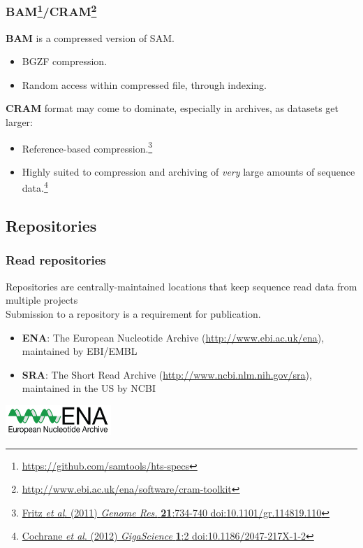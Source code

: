 \begin{frame}[fragile]
  \frametitle{BAM\footnote{\tiny{\href{http://samtools.github.io/hts-specs/SAMv1.pdf}{https://github.com/samtools/hts-specs}}}/CRAM\footnote{\tiny{\href{http://www.ebi.ac.uk/ena/software/cram-toolkit}{http://www.ebi.ac.uk/ena/software/cram-toolkit}}}}
  \textbf{BAM} is a compressed version of SAM.\\
  \begin{itemize}
    \item BGZF compression.
    \item Random access within compressed file, through indexing.
  \end{itemize}
  \textbf{CRAM} format may come to dominate, especially in archives, as datasets get larger:
  \begin{itemize}
    \item Reference-based compression.\footnote{\tiny{\href{http://dx.doi.org/10.1101/gr.114819.110}{Fritz \textit{et al}. (2011) \textit{Genome Res.} \textbf{21}:734-740 doi:10.1101/gr.114819.110}}}
    \item Highly suited to compression and archiving of \textit{very} large amounts of sequence data.\footnote{\tiny{\href{http://dx.doi.org/10.1186/2047-217X-1-2}{Cochrane \textit{et al}. (2012) \textit{GigaScience} \textbf{1}:2 doi:10.1186/2047-217X-1-2}}}
  \end{itemize}  
\end{frame}

\subsection{Repositories}

\begin{frame}[fragile]
  \frametitle{Read repositories}
  Repositories are centrally-maintained locations that keep sequence read data from multiple projects\\
  Submission to a repository is a requirement for publication.
    \begin{itemize}
    \item \textbf{ENA}: The European Nucleotide Archive (\href{http://www.ebi.ac.uk/ena}{http://www.ebi.ac.uk/ena}), maintained by EBI/EMBL
    \item \textbf{SRA}: The Short Read Archive (\href{http://www.ncbi.nlm.nih.gov/sra}{http://www.ncbi.nlm.nih.gov/sra}), maintained in the US by NCBI
  \end{itemize}
  \begin{center}
    \includegraphics[width=0.3\textwidth]{images/ENA-logo}
  \end{center}    
\end{frame}


